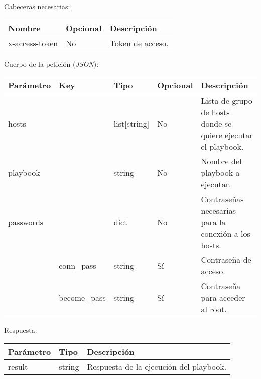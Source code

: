 		Cabeceras necesarias:
		\begin{table}[h!]
			\centering
	\begin{adjustbox}{max width=\textwidth}
			\begin{tabular}{|l|l|l|}
				\hline
				Nombre & Opcional & Descripción \\ \hline
				x-access-token & No & Token de acceso. \\ \hline
			\end{tabular}
\end{adjustbox}
		\end{table}
		
		Cuerpo de la petición (\textit{JSON}):
		\begin{table}[h!]
			\centering
	\begin{adjustbox}{max width=\textwidth}
			\begin{tabularx}{\linewidth}{|l|l|l|l|L|}
				\hline
				Parámetro & Key & Tipo & Opcional & Descripción \\ \hline
				hosts &  & list[string] & No & Lista de grupo de hosts donde se quiere ejecutar el playbook. \\ \hline
				playbook &  & string & No & Nombre del playbook a ejecutar. \\ \hline
				passwords &  & dict & No & Contraseñas necesarias para la conexión a los hosts. \\ \hline
				& conn\_pass & string & Sí & Contraseña de acceso. \\ \hline
				& become\_pass & string & Sí & Contraseña para acceder al root. \\ \hline
			\end{tabularx}
\end{adjustbox}
		\end{table}
		
		\pagebreak
		Respuesta:
		\begin{table}[h!]
			\centering
	\begin{adjustbox}{max width=\textwidth}
			\begin{tabular}{|l|l|l|}
				\hline
				Parámetro & Tipo & Descripción \\ \hline
				result & string & Respuesta de la ejecución del playbook. \\ \hline
			\end{tabular}
\end{adjustbox}
		\end{table}







